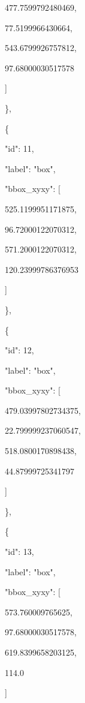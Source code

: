 \documentclass[10pt,a4paper]{article}
\begin{document}
        477.7599792480469,\allowbreak{}\par
        77.5199966430664,\allowbreak{}\par
        543.6799926757812,\allowbreak{}\par
        97.68000030517578\par
      ]\par
    \},\allowbreak{}\par
    \{\par
      "id":\allowbreak{} 11,\allowbreak{}\par
      "label":\allowbreak{} "box",\allowbreak{}\par
      "bbox\_xyxy":\allowbreak{} [\par
        525.1199951171875,\allowbreak{}\par
        96.72000122070312,\allowbreak{}\par
        571.2000122070312,\allowbreak{}\par
        120.23999786376953\par
      ]\par
    \},\allowbreak{}\par
    \{\par
      "id":\allowbreak{} 12,\allowbreak{}\par
      "label":\allowbreak{} "box",\allowbreak{}\par
      "bbox\_xyxy":\allowbreak{} [\par
        479.03997802734375,\allowbreak{}\par
        22.799999237060547,\allowbreak{}\par
        518.0800170898438,\allowbreak{}\par
        44.87999725341797\par
      ]\par
    \},\allowbreak{}\par
    \{\par
      "id":\allowbreak{} 13,\allowbreak{}\par
      "label":\allowbreak{} "box",\allowbreak{}\par
      "bbox\_xyxy":\allowbreak{} [\par
        573.760009765625,\allowbreak{}\par
        97.68000030517578,\allowbreak{}\par
        619.8399658203125,\allowbreak{}\par
        114.0\par
      ]\par
\end{document}
